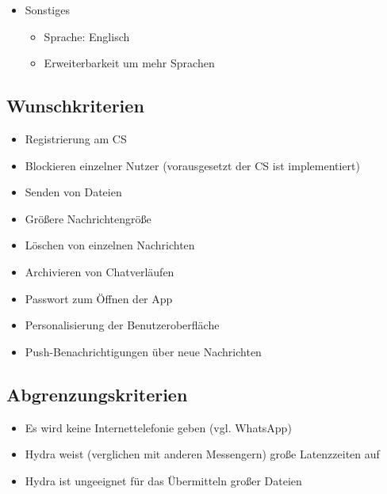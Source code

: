 \begin{itemize}
	\item Sonstiges
	\begin{itemize}
		\item Sprache: Englisch
		\item Erweiterbarkeit um mehr Sprachen
	\end{itemize}
	
\end{itemize}

\subsection{Wunschkriterien}
\begin{itemize}
	\item Registrierung am \ac{CS}
	\item Blockieren einzelner Nutzer (vorausgesetzt der \ac{CS} ist implementiert)
	\item Senden von Dateien
		\item Größere Nachrichtengröße
	\item Löschen von einzelnen Nachrichten
	\item Archivieren von Chatverläufen
	\item Passwort zum Öffnen der App
	\item Personalisierung der Benutzeroberfläche
	\item Push-Benachrichtigungen über neue Nachrichten
\end{itemize}

\subsection{Abgrenzungskriterien}
\begin{itemize}
	\item Es wird keine Internettelefonie geben (vgl. WhatsApp)
	\item Hydra weist (verglichen mit anderen Messengern) große Latenzzeiten auf
	\item Hydra ist ungeeignet für das Übermitteln großer Dateien
\end{itemize}
